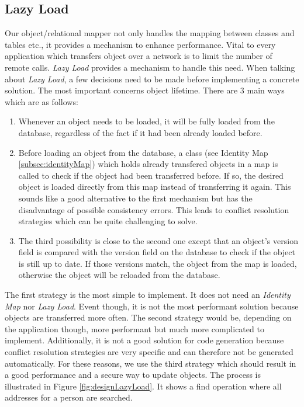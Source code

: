 		\subsection{Lazy Load}
		\label{subsec:LazyLoad}
			Our object/relational mapper not only handles the mapping between classes and tables etc., it
			provides a mechanism to enhance performance. Vital to every application which transfers
			object over a network is to limit the number of remote calls. \textit{Lazy Load} provides
			a mechanism to handle this need. When talking about \textit{Lazy Load}, a few decisions need to be
			made before implementing a concrete solution. The most important concerns object lifetime. There are
			3 main ways which are as follows:
			\begin{enumerate}
				\item Whenever an object needs to be loaded, it will be fully loaded from the database,
							regardless of the fact if it had been already loaded before.
				\item	Before loading an object from the database, a class (see Identity Map \ref{subsec:identityMap}) which holds
							already transfered objects in a map is called to check if the object had been transferred before. 
							If so, the desired object is loaded	directly from this map instead of transferring it again. This
							sounds like a good alternative to the first mechanism but has the disadvantage of possible consistency
							errors. This leads to conflict resolution strategies which can be quite challenging to solve.
				\item	The third possibility is close to the second one except that an object's version field is compared
							with the version field on the database to check if the object is still up to date. If those versions
							match, the object from the map is loaded, otherwise the object will be reloaded from the
							database.
			\end{enumerate}
			The first strategy is the most simple to implement. It does not need an \textit{Identity Map} nor 
			\textit{Lazy Load}. Event though, it is not the most performant solution because objects are transferred
			more often. The second strategy would be, depending on the application though, more performant but much
			more complicated to implement. Additionally, it is not a good solution for code generation because
			conflict resolution strategies are very specific and can therefore not be generated automatically.
			For these reasons, we use the third strategy which should result in a good performance and a secure
			way to update objects. The process is illustrated in Figure \ref{fig:designLazyLoad}. It shows
			a find operation where all addresses for a person are searched.

